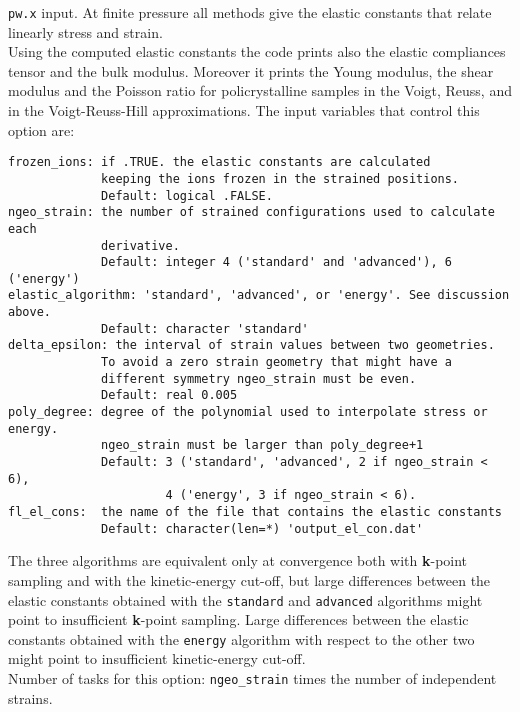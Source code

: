 \documentclass[12pt,a4paper]{article}
\begin{document}
\texttt{pw.x} input.
At finite pressure all methods give the elastic constants that
relate linearly stress and strain. \\
Using the computed elastic constants the code prints also the elastic 
compliances tensor and the bulk modulus. Moreover it prints the
Young modulus, the shear modulus and the Poisson ratio for policrystalline
samples in the Voigt, Reuss, and in the Voigt-Reuss-Hill approximations.
The input variables that control this option are:
\begin{verbatim}
frozen_ions: if .TRUE. the elastic constants are calculated 
             keeping the ions frozen in the strained positions. 
             Default: logical .FALSE.
ngeo_strain: the number of strained configurations used to calculate each
             derivative. 
             Default: integer 4 ('standard' and 'advanced'), 6 ('energy')
elastic_algorithm: 'standard', 'advanced', or 'energy'. See discussion above.
             Default: character 'standard' 
delta_epsilon: the interval of strain values between two geometries.
             To avoid a zero strain geometry that might have a
             different symmetry ngeo_strain must be even.
             Default: real 0.005
poly_degree: degree of the polynomial used to interpolate stress or energy.
             ngeo_strain must be larger than poly_degree+1
             Default: 3 ('standard', 'advanced', 2 if ngeo_strain < 6), 
                      4 ('energy', 3 if ngeo_strain < 6).
fl_el_cons:  the name of the file that contains the elastic constants
             Default: character(len=*) 'output_el_con.dat'
\end{verbatim}
The three algorithms are equivalent only at convergence both with
{\bf k}-point sampling and with the kinetic-energy cut-off, but 
large differences between the elastic constants obtained with the 
\texttt{standard} and \texttt{advanced} algorithms might point to 
insufficient {\bf k}-point sampling. Large differences between the 
elastic constants obtained with the \texttt{energy} algorithm with respect 
to the other two might point to insufficient kinetic-energy cut-off. \\
Number of tasks for this option: \texttt{ngeo\_strain} times the number of
independent strains. \\
\end{document}
